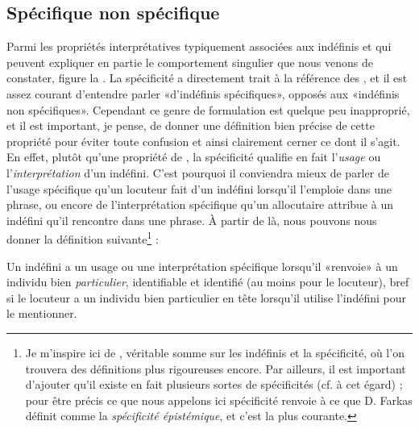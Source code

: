 
\subsection{Spécifique {\vs} non spécifique}
\label{ss:specificite}

Parmi les propriétés interprétatives typiquement associées aux {\GN}
indéfinis et qui peuvent expliquer en partie le comportement singulier
que nous venons de constater, figure la
.  La spécificité a directement trait à
la référence des {\GN}, et il est assez courant d'entendre parler
«d'indéfinis spécifiques», opposés aux «indéfinis non
spécifiques».  Cependant ce genre de formulation est quelque peu
inapproprié, et il est important, je pense, de donner une définition
bien précise de cette propriété pour éviter toute confusion et ainsi
clairement cerner ce dont il s'agit.  En effet, plutôt qu'une
propriété de {\GN}, la spécificité qualifie en fait l'\emph{usage} ou
l'\emph{interprétation} d'un {\GN} indéfini.  C'est pourquoi il
conviendra mieux de parler de l'usage spécifique qu'un locuteur fait
d'un indéfini lorsqu'il l'emploie dans une phrase, ou encore de
l'interprétation spécifique qu'un allocutaire attribue à un indéfini
qu'il rencontre dans une phrase.  À partir de là, nous pouvons nous
donner la définition suivante\footnote{Je m'inspire ici de 
\citet{BFKamp:01e},
 véritable somme sur les indéfinis et la
 spécificité, où l'on trouvera des définitions plus rigoureuses encore.
Par ailleurs, il est important d'ajouter qu'il existe en fait plusieurs sortes de spécificités (cf. \citet{Farkas:02spec} à cet égard) ; pour être précis ce que nous appelons ici spécificité renvoie à ce que D. Farkas définit comme la \emph{spécificité épistémique}, et c'est la plus courante.
} :


\begin{defi}[Spécificité]\label{def:spécificité}
Un {\GN} indéfini a un usage ou une interprétation spécifique lorsqu'il
«renvoie» 
à un individu bien \emph{particulier}, identifiable et identifié (au
moins pour le locuteur), bref si le locuteur a un individu bien
particulier en tête lorsqu'il utilise l'indéfini pour le mentionner.
\end{defi}


